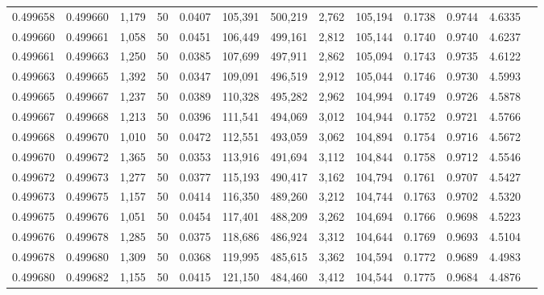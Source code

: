 \begin{tabular}{rrrrrrrrrrrrr}
0.499658 & 0.499660 & 1,179 &  50 &                                     0.0407 & 105,391 & 500,219 &   2,762 & 105,194 & 0.1738 & 0.9744 & 4.6335 \\
0.499660 & 0.499661 & 1,058 &  50 &                                     0.0451 & 106,449 & 499,161 &   2,812 & 105,144 & 0.1740 & 0.9740 & 4.6237 \\
0.499661 & 0.499663 & 1,250 &  50 &                                     0.0385 & 107,699 & 497,911 &   2,862 & 105,094 & 0.1743 & 0.9735 & 4.6122 \\
0.499663 & 0.499665 & 1,392 &  50 &                                     0.0347 & 109,091 & 496,519 &   2,912 & 105,044 & 0.1746 & 0.9730 & 4.5993 \\
0.499665 & 0.499667 & 1,237 &  50 &                                     0.0389 & 110,328 & 495,282 &   2,962 & 104,994 & 0.1749 & 0.9726 & 4.5878 \\
0.499667 & 0.499668 & 1,213 &  50 &                                     0.0396 & 111,541 & 494,069 &   3,012 & 104,944 & 0.1752 & 0.9721 & 4.5766 \\
0.499668 & 0.499670 & 1,010 &  50 &                                     0.0472 & 112,551 & 493,059 &   3,062 & 104,894 & 0.1754 & 0.9716 & 4.5672 \\
0.499670 & 0.499672 & 1,365 &  50 &                                     0.0353 & 113,916 & 491,694 &   3,112 & 104,844 & 0.1758 & 0.9712 & 4.5546 \\
0.499672 & 0.499673 & 1,277 &  50 &                                     0.0377 & 115,193 & 490,417 &   3,162 & 104,794 & 0.1761 & 0.9707 & 4.5427 \\
0.499673 & 0.499675 & 1,157 &  50 &                                     0.0414 & 116,350 & 489,260 &   3,212 & 104,744 & 0.1763 & 0.9702 & 4.5320 \\
0.499675 & 0.499676 & 1,051 &  50 &                                     0.0454 & 117,401 & 488,209 &   3,262 & 104,694 & 0.1766 & 0.9698 & 4.5223 \\
0.499676 & 0.499678 & 1,285 &  50 &                                     0.0375 & 118,686 & 486,924 &   3,312 & 104,644 & 0.1769 & 0.9693 & 4.5104 \\
0.499678 & 0.499680 & 1,309 &  50 &                                     0.0368 & 119,995 & 485,615 &   3,362 & 104,594 & 0.1772 & 0.9689 & 4.4983 \\
0.499680 & 0.499682 & 1,155 &  50 &                                     0.0415 & 121,150 & 484,460 &   3,412 & 104,544 & 0.1775 & 0.9684 & 4.4876 \\

\end{tabular}
